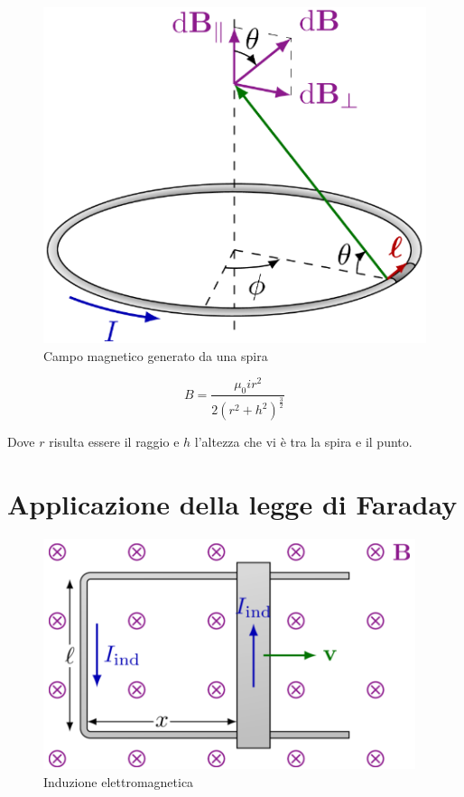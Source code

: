 \begin{figure}[H]
    \centering
    \includegraphics[scale = 0.5]{image/spira.png}
    \caption{Campo magnetico generato da una spira}
    \label{spira}
\end{figure}

\begin{equation}
    B = \frac{\mu_0 i r^2}{2(r^2 + h^2)^{\frac{3}{2}}}
\end{equation}

Dove $r$ risulta essere il raggio e $h$ l'altezza che vi è tra la spira e il punto.

\section{Applicazione della legge di Faraday}

\begin{figure}[H]
    \centering
    \includegraphics[scale = 0.5]{image/FaradayApplicazione.png}
    \caption{Induzione elettromagnetica}
    \label{FaradayApplicazione}
\end{figure}

